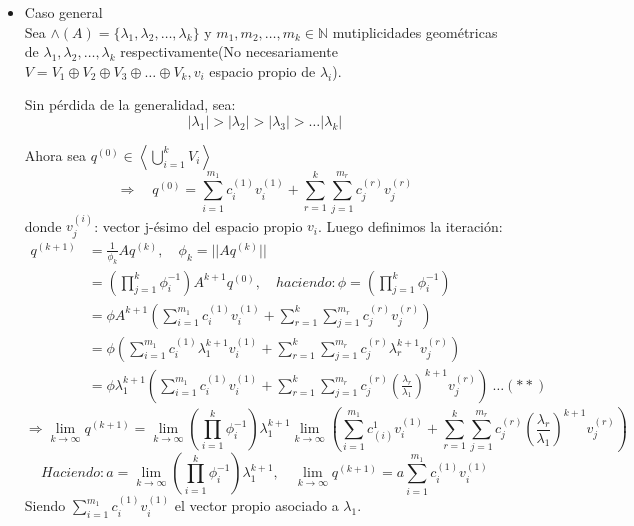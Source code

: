 \documentclass[10pt,a4paper]{article}
\begin{document}
\begin{itemize}
	\item Caso general\\
	
	Sea $\wedge (A) = \{\lambda_{1},\lambda_{2},\ldots ,\lambda_{k}\}$ y $m_{1},m_{2}, \ldots , m_{k}\in\mathbb{N}$ mutiplicidades geométricas de $\lambda_{1},\lambda_{2},\ldots ,\lambda_{k}$ respectivamente(No necesariamente $V = V_{1}\oplus V_{2}\oplus V_{3}\oplus\ldots\oplus V_{k}, v_{i}$ espacio propio de $\lambda_{i}$).
	
	Sin pérdida de la generalidad, sea:
	$$\vert\lambda_{1}\vert > \vert\lambda_{2}\vert > \vert\lambda_{3}\vert > \ldots\vert\lambda_{k}\vert$$
	
	Ahora sea $q^{(0)}\in\left<\bigcup_{i=1}^{k}V_{i}\right>$
	$$\Rightarrow\quad q^{(0)} = \sum_{i=1}^{m_{1}}c_{i}^{(1)}v_{i}^{(1)} + \sum_{r=1}^{k}\sum_{j=1}^{m_{r}}c_{j}^{(r)}v_{j}^{(r)}$$
	donde $v_{j}^{(i)}$: vector j-ésimo del espacio propio $v_{i}$.
	Luego definimos la iteración:
\begin{align*}
	q^{(k+1)} &= \frac{1}{\phi_{k}}Aq^{(k)}, \quad \phi_{k} = \vert\vert Aq^{(k)} \vert\vert\\
	&= \left(\prod_{j=1}^{k}\phi_{i}^{-1}\right)A^{k+1}q^{(0)}, \quad haciendo: \phi = \left(\prod_{j=1}^{k}\phi_{i}^{-1}\right)\\
	&= \phi A^{k+1}\left(\sum_{i=1}^{m_{1}}c_{i}^{(1)}v_{i}^{(1)} + \sum_{r=1}^{k}\sum_{j=1}^{m_{r}}c_{j}^{(r)}v_{j}^{(r)}\right)\\
	&= \phi \left(\sum_{i=1}^{m_{1}}c_{i}^{(1)}\lambda_{1}^{k+1}v_{i}^{(1)} + \sum_{r=1}^{k}\sum_{j=1}^{m_{r}}c_{j}^{(r)}\lambda_{r}^{k+1}v_{j}^{(r)}\right)\\
	&= \phi\lambda_{1}^{k+1} \left(\sum_{i=1}^{m_{1}}c_{i}^{(1)}v_{i}^{(1)} + \sum_{r=1}^{k}\sum_{j=1}^{m_{r}}c_{j}^{(r)}\left(\frac{\lambda_{r}}{\lambda_{1}}\right)^{k+1}v_{j}^{(r)}\right) \: \ldots(**)
\end{align*}
	$$\Rightarrow \lim_{k\rightarrow\infty}q^{(k+1)} = \lim_{k\rightarrow\infty}\left(\prod_{i=1}^{k}\phi_{i}^{-1}\right)\lambda_{1}^{k+1}\lim_{k\rightarrow\infty}\left(\sum_{i=1}^{m_{1}}c_{(i)}^{1}v_{i}^{(1)} + \sum_{r=1}^{k}\sum_{j=1}^{m_{r}}c_{j}^{(r)}\left(\frac{\lambda_{r}}{\lambda_{1}}\right)^{k+1}v_{j}^{(r)}\right)$$
	$$Haciendo: a = \lim_{k\rightarrow\infty}\left(\prod_{i=1}^{k}\phi_{i}^{-1}\right)\lambda_{1}^{k+1}, \quad \lim_{k\rightarrow\infty}q^{(k+1)} = a\sum_{i=1}^{m_{1}}c_{i}^{(1)}v_{i}^{(1)}$$
	Siendo $\sum_{i=1}^{m_{1}}c_{i}^{(1)}v_{i}^{(1)}$ el vector propio asociado a $\lambda_{1}$.


\end{itemize}
\end{document}
